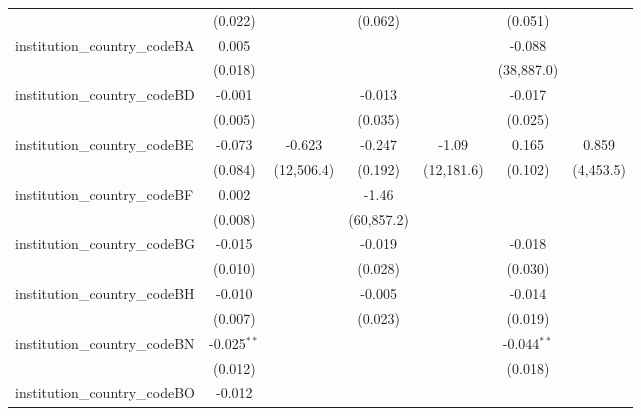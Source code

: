 \begin{tabular}{lcccccc}
                                         & (0.022)        &               & (0.062)       &               & (0.051)       &   \\   
   institution\_country\_codeBA          & 0.005          &               &               &               & -0.088        &   \\   
                                         & (0.018)        &               &               &               & (38,887.0)    &   \\   
   institution\_country\_codeBD          & -0.001         &               & -0.013        &               & -0.017        &   \\   
                                         & (0.005)        &               & (0.035)       &               & (0.025)       &   \\   
   institution\_country\_codeBE          & -0.073         & -0.623        & -0.247        & -1.09         & 0.165         & 0.859\\   
                                         & (0.084)        & (12,506.4)    & (0.192)       & (12,181.6)    & (0.102)       & (4,453.5)\\   
   institution\_country\_codeBF          & 0.002          &               & -1.46         &               &               &   \\   
                                         & (0.008)        &               & (60,857.2)    &               &               &   \\   
   institution\_country\_codeBG          & -0.015         &               & -0.019        &               & -0.018        &   \\   
                                         & (0.010)        &               & (0.028)       &               & (0.030)       &   \\   
   institution\_country\_codeBH          & -0.010         &               & -0.005        &               & -0.014        &   \\   
                                         & (0.007)        &               & (0.023)       &               & (0.019)       &   \\   
   institution\_country\_codeBN          & -0.025$^{**}$  &               &               &               & -0.044$^{**}$ &   \\   
                                         & (0.012)        &               &               &               & (0.018)       &   \\   
   institution\_country\_codeBO          & -0.012         &               &               &               &               &   \\   

\end{tabular}
